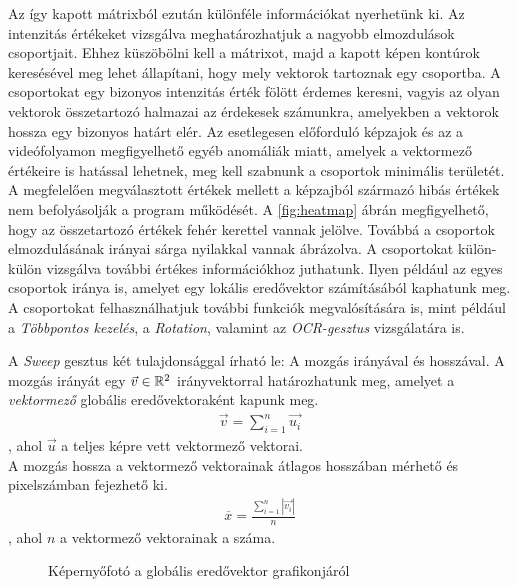 Az így kapott mátrixból ezután különféle információkat nyerhetünk ki. Az intenzitás értékeket vizsgálva meghatározhatjuk a nagyobb elmozdulások csoportjait. Ehhez küszöbölni kell a mátrixot, majd a kapott képen kontúrok keresésével meg lehet állapítani, hogy mely vektorok tartoznak egy csoportba. A csoportokat egy bizonyos intenzitás érték fölött érdemes keresni, vagyis az olyan vektorok összetartozó halmazai az érdekesek számunkra, amelyekben a vektorok hossza egy bizonyos határt elér. Az esetlegesen előforduló képzajok és az a videófolyamon megfigyelhető egyéb anomáliák miatt, amelyek a vektormező értékeire is hatással lehetnek, meg kell szabnunk a csoportok minimális területét. A megfelelően megválasztott értékek mellett a képzajból származó hibás értékek nem befolyásolják a program működését.
A \ref{fig:heatmap} ábrán megfigyelhető, hogy az összetartozó értékek fehér kerettel vannak jelölve. Továbbá a csoportok elmozdulásának irányai sárga nyilakkal vannak ábrázolva. A csoportokat külön-külön vizsgálva további értékes információkhoz juthatunk. Ilyen például az egyes csoportok iránya is, amelyet egy lokális eredővektor számításából kaphatunk meg. A csoportokat felhasználhatjuk további funkciók megvalósítására is, mint például a \textit{Többpontos kezelés}, a \textit{Rotation}, valamint az \textit{OCR-gesztus} vizsgálatára is.



A \textit{Sweep} gesztus két tulajdonsággal írható le: A mozgás irányával és hosszával. A mozgás irányát egy $\vec{v}\in\Bbb R^2$ irányvektorral határozhatunk meg, amelyet a \textit{vektormező} globális eredővektoraként kapunk meg.
\begin{align*}
  \vec{v} = \sum_{i=1}^n\vec{u_i}
\end{align*}
, ahol $\vec{u}$ a teljes képre vett vektormező vektorai.\\
A mozgás hossza a vektormező vektorainak átlagos hosszában mérhető és pixelszámban fejezhető ki.
\begin{align*}
  \overline{x}=\frac{\sum_{i=1}^n \left|\vec{v_i}\right|}{n}
\end{align*}
, ahol $n$ a vektormező vektorainak a száma.

\begin{figure}[h]
\centering
{}
\caption{Képernyőfotó a globális eredővektor grafikonjáról}
\label{fig:resultantplot}
\end{figure}

